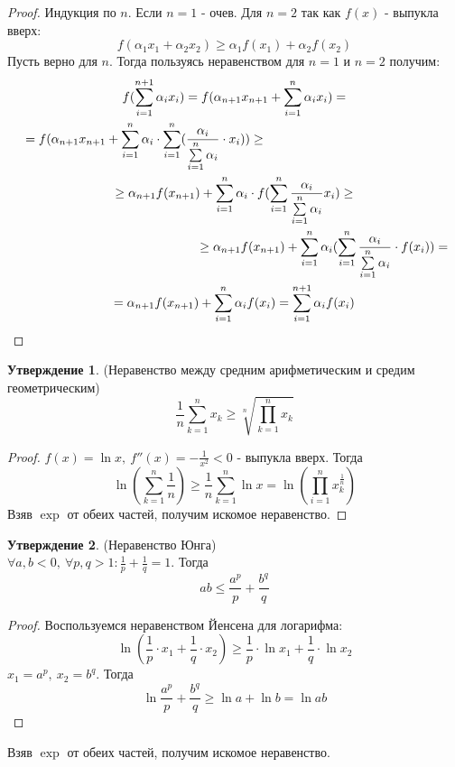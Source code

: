 \documentclass[a4paper, 12pt]{article}
\newcommand\tab[1][.5cm]{\hspace*{#1}}
\theoremstyle{definition}
\newtheorem*{statement}{Утверждение}
\begin{document}
        \begin{proof}
            Индукция по $n$. Если $n=1$ - очев. Для $n=2$ так как $f(x)$ - выпукла вверх: 
            \[f(\alpha_1 x_1+\alpha_2 x_2)\geq \alpha_1 f(x_1)+\alpha_2 f(x_2)\]
            Пусть верно для $n$. Тогда пользуясь неравенством для $n=1$ и $n=2$ получим:
            \begin{multline*}
                f(\sum\limits_{i=1}^{n+1}\alpha_i x_i)=f(\alpha_{n+1}x_{n+1}+\sum\limits_{i=1}^{n}\alpha_i x_i)=\\
                =f(\alpha_{n+1}x_{n+1}+\sum\limits_{i=1}^{n}\alpha_i \cdot \sum\limits_{i=1}^{n}(\frac{\alpha_i}{\sum\limits_{i=1}^{n}\alpha_i}\cdot x_i))\geq\tab[5cm]\\
                \geq \alpha_{n+1} f(x_{n+1})+\sum\limits_{i=1}^{n}\alpha_i\cdot f(\sum\limits_{i=1}^{n}\frac{\alpha_i}{\sum\limits_{i=1}^{n}\alpha_i} x_i)\geq\\
                \tab[5cm]\geq \alpha_{n+1} f(x_{n+1})+\sum\limits_{i=1}^{n}\alpha_i(\sum\limits_{i=1}^{n}\frac{\alpha_i}{\sum\limits_{i=1}^{n}\alpha_i}\cdot f(x_i))=\\
                =\alpha_{n+1}f(x_{n+1})+\sum\limits_{i=1}^{n}\alpha_i f(x_i)=\sum\limits_{i=1}^{n+1}\alpha_i f(x_i)
            \end{multline*}
        \end{proof} 
        \begin{statement}
            (Неравенство между средним арифметическим и средим геометрическим)
            \[\frac{1}{n}\sum\limits_{k=1}^{n}x_k\geq \sqrt[n]{\prod\limits_{k=1}^{n}x_k}\]
        \end{statement}
        \begin{proof}
            $f(x)=\ln{x},\ f''(x)=-\frac{1}{x^2}<0$ - выпукла вверх. Тогда
            \[\ln({\sum\limits_{k=1}^{n}\frac{1}{n}})\geq \frac{1}{n} \sum\limits_{k=1}^{n}\ln{x}=\ln({\prod\limits_{i=1}^{n}x_k^{\frac{1}{n}}})\]
            Взяв $\exp$ от обеих частей, получим искомое неравенство.
        \end{proof} 
        \begin{statement}
            (Неравенство Юнга)\\
            $\forall a,b<0,\ \forall p,q>1: \frac{1}{p}+\frac{1}{q}=1$. Тогда 
            \[ab\leq \frac{a^p}{p}+\frac{b^q}{q}\]
        \end{statement}
        \begin{proof}
            Воспользуемся неравенством Йенсена для логарифма:
            \[\ln({\frac{1}{p}\cdot x_1+\frac{1}{q}\cdot x_2})\geq \frac{1}{p}\cdot \ln{x_1}+\frac{1}{q}\cdot \ln{x_2}\]
            $x_1=a^p,\ x_2=b^q$. Тогда
            \[\ln{\frac{a^p}{p}+\frac{b^q}{q}}\geq \ln{a}+\ln{b}=\ln{ab}\]
        \end{proof} 
        Взяв $\exp$ от обеих частей, получим искомое неравенство.
\end{document}
